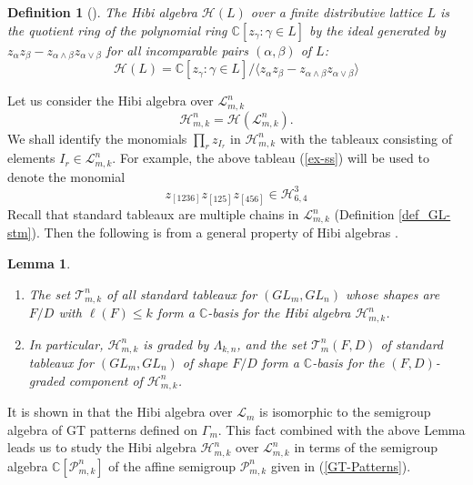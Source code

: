 \documentclass[11pt]{amsart}
\numberwithin{equation}{subsection}
\newtheorem{definition}[theorem]{Definition}
\newtheorem{lemma}[theorem]{Lemma}
\begin{document}
\begin{definition} [{\protect\cite{Hi87}}]
The \textit{Hibi algebra} $\mathcal{H}(L)$ over a finite distributive lattice $L$ 
is the quotient ring of the polynomial ring $\mathbb{C}[z_{\gamma }:\gamma \in L]$ 
by the ideal generated by 
$z_{\alpha }z_{\beta } - z_{\alpha \wedge \beta }z_{\alpha \vee \beta }$ for all 
incomparable pairs $(\alpha ,\beta )$ of $L$:
\begin{equation*}
\mathcal{H}(L) = \mathbb{C}[z_{\gamma }:\gamma \in L] / 
\langle z_{\alpha }z_{\beta } - z_{\alpha \wedge \beta }z_{\alpha \vee \beta } \rangle
\end{equation*}
\end{definition}

Let us consider the Hibi algebra over $\mathcal{L}_{m,k}^{n}$
\begin{equation*}
\mathcal{H}_{m,k}^{n}=\mathcal{H}(\mathcal{L}_{m,k}^{n}).
\end{equation*}
We shall identify the monomials $\prod_r {z_{I_r}}$ in $\mathcal{H}_{m,k}^{n}$
with the tableaux consisting of elements $I_r \in \mathcal{L}_{m,k}^{n}$. For 
example, the above tableau (\ref{ex-ss}) will be used to denote the monomial 
$$
z_{[1236]} z_{[125]} z_{[456]} \in \mathcal{H}_{6,4}^{3}
$$
Recall that standard tableaux are multiple chains in $\mathcal{L}_{m,k}^{n}$ 
(Definition \ref{def_GL-stm}). Then the following is from a general property 
of Hibi algebras \cite{Hi87, How05}.

\begin{lemma} \label{Hibi-basis}
\begin{enumerate}
\item The set $\mathcal{T}_{m,k}^{n}$ of all standard tableaux for 
$({GL}_{{m}},{GL}_{{n}})$ whose shapes are $F/D$ with $\ell (F)\leq k$ form 
a $\mathbb{C}$-basis for the Hibi algebra $\mathcal{H}_{m,k}^{n}$.

\item In particular, $\mathcal{H}_{m,k}^{n}$ is graded by $\Lambda_{k,n}$, and 
the set $\mathcal{T}_m ^n(F,D)$ of standard tableaux for $(GL_m, GL_n)$
of shape $F/D$ form a $\mathbb{C}$-basis for the $(F,D)$-graded component of 
$\mathcal{H}_{m,k}^n$.
\end{enumerate}
\end{lemma}

It is shown in \cite[Corollary 3.14]{Ki08} that the Hibi algebra over 
$\mathcal{L}_{m}$ is isomorphic to the semigroup algebra of GT patterns
defined on $\Gamma _{m}$. This fact combined with the above Lemma leads us
to study the Hibi algebra $\mathcal{H}_{m,k}^{n}$ over 
$\mathcal{L}_{m,k}^{n} $ in terms of the semigroup algebra 
$\mathbb{C}[\mathcal{P}_{m,k}^{n}]$ of the affine semigroup $\mathcal{P}_{m,k}^{n}$
given in (\ref{GT-Patterns}).
\end{document}
